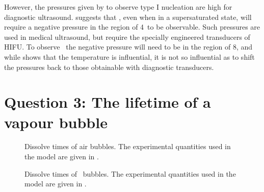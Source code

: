However, the pressures given by   to observe type I nucleation are high for diagnostic ultrasound.
 suggests that  \pfb, even when in a supersaturated state,
will  require a negative pressure in the region of \unit{4}\mega\pascal\ to be observable. 
Such pressures are used in medical ultrasound, but require the specially engineered transducers of HIFU.
To observe \pfp\ the negative pressure will need to be in the region of \unit{8}\mega\pascal,
and while  shows that the temperature is influential, 
it is not so influential as to shift the pressures back to those obtainable with diagnostic transducers.




\section{Question 3: The lifetime of a vapour bubble}\label{sec:nuc:lifetime}


\begin{figure}
  \subfloat[Dissolution of a \unit{1}\micro\metre\ air bubble when $\zeta=0$]{ \label{fig:nuc:dissolve_time_lum}}
  \caption{ Dissolve times of air bubbles.  The experimental quantities used in the model are given in .}
\end{figure}

\begin{figure}
  \subfloat[Dissolution of a \unit{1}\micro\metre\ \pfp\ bubble when $\zeta=0$]{\label{fig:nuc:dissolve_time_lumPFP}}
  \caption{ Dissolve times of \pfp\ bubbles.  The experimental quantities used in the model are given in . }
 \label{fig:nuc:dissolve_time_lum}
\end{figure}


